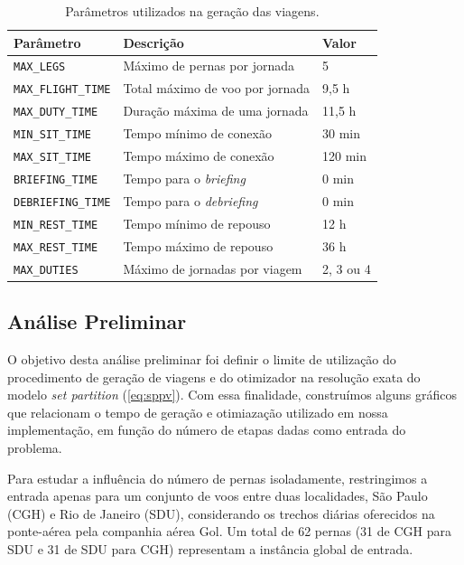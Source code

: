\documentclass[12pt,a4paper]{article}
\begin{document}
\begin{table}
	\begin{center}
		\begin{tabular}{|l|l|l|}
			\hline 
			\bf Parâmetro & \bf Descrição & \bf Valor \\
			\hline \hline 
			\verb|MAX_LEGS| & Máximo de pernas por jornada & 5 \\ \hline
			\verb|MAX_FLIGHT_TIME| & Total máximo de voo por jornada & 9,5 h \\ \hline
			\verb|MAX_DUTY_TIME| & Duração máxima de uma jornada & 11,5 h \\ \hline
			\verb|MIN_SIT_TIME| & Tempo mínimo de conexão & 30 min \\ \hline
			\verb|MAX_SIT_TIME| & Tempo máximo de conexão & 120 min \\ \hline
			\verb|BRIEFING_TIME| & Tempo para o {\it briefing} & 0 min \\ \hline
			\verb|DEBRIEFING_TIME| & Tempo para o {\it debriefing} & 0 min \\ \hline
			\verb|MIN_REST_TIME| & Tempo mínimo de repouso & 12 h \\ \hline
			\verb|MAX_REST_TIME| & Tempo máximo de repouso & 36 h \\ \hline
			\verb|MAX_DUTIES| & Máximo de jornadas por viagem & 2, 3 ou 4 \\ \hline
			\end{tabular} 
			\caption{Parâmetros utilizados na geração das viagens.}
			\label{tab:parametros}
	\end{center}
\end{table}


\subsection{Análise Preliminar}
\label{sec:analise_p}

O objetivo desta análise preliminar foi definir o limite de utilização do procedimento de geração
de viagens e do otimizador na resolução exata do modelo {\it set partition} (\ref{eq:sppv}).
Com essa finalidade, construímos alguns gráficos que relacionam o tempo de geração e otimiazação 
utilizado em nossa implementação, em função do número de etapas dadas como entrada do problema.

Para estudar a influência do número de pernas isoladamente, restringimos a entrada apenas para um
conjunto de voos entre duas localidades, São Paulo (CGH) e Rio de Janeiro (SDU), considerando os
trechos diárias oferecidos na ponte-aérea pela companhia aérea Gol. Um total de 62 pernas 
(31 de CGH para SDU e 31 de SDU para CGH) representam a instância global de entrada.
\end{document}
